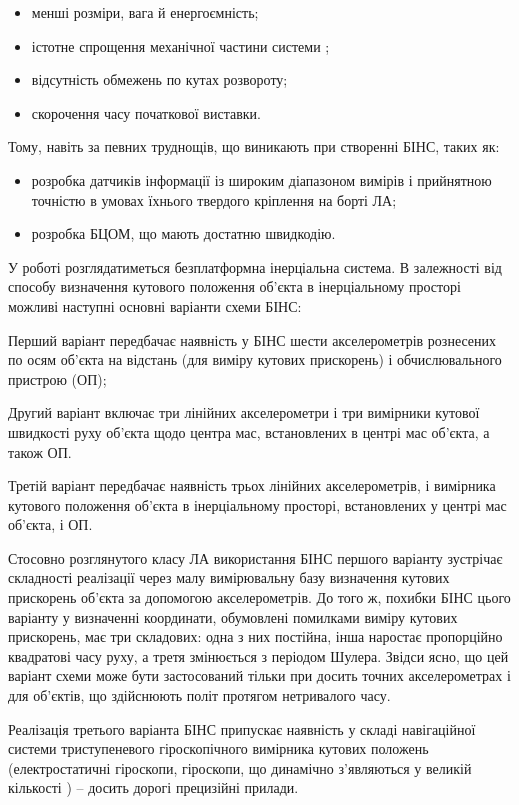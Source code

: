 \begin{itemize}
 \item менші розміри, вага й енергоємність;
 \item істотне спрощення механічної частини системи ; 
 \item відсутність обмежень по кутах розвороту;
 \item скорочення часу початкової виставки.
\end{itemize}

Тому, навіть за певних труднощів, що виникають при створенні БІНС, таких як:
\begin{itemize}
 \item розробка датчиків інформації із широким діапазоном вимірів і прийнятною точністю в умовах їхнього твердого кріплення на борті ЛА;
 \item розробка БЦОМ, що мають достатню швидкодію.
\end{itemize}

У роботі розглядатиметься безплатформна інерціальна система.
В залежності від способу визначення кутового положення об'єкта в інерціальному просторі 
можливі наступні основні варіанти схеми БІНС:

Перший варіант передбачає наявність у БІНС шести акселерометрів  рознесених по осям об'єкта на відстань 
(для виміру кутових прискорень) і обчислювального пристрою (ОП);

Другий варіант включає три лінійних акселерометри  і три вимірники кутової 
швидкості руху об'єкта щодо центра мас, встановлених в центрі мас об'єкта, а також ОП.

Третій варіант передбачає наявність трьох лінійних акселерометрів, і вимірника 
кутового положення об'єкта в інерціальному просторі, встановлених у центрі мас об'єкта, і ОП.

Стосовно розглянутого класу ЛА використання БІНС першого варіанту зустрічає складності 
реалізації через малу вимірювальну базу  визначення кутових прискорень об'єкта за 
допомогою акселерометрів. До того ж, похибки БІНС цього варіанту у визначенні координати, 
обумовлені помилками виміру кутових прискорень, має три складових: одна з них постійна, 
інша наростає пропорційно квадратові часу руху, а третя змінюється з періодом Шулера. 
Звідси ясно, що цей варіант схеми може бути застосований тільки при досить точних 
акселерометрах і для об'єктів, що здійснюють політ протягом нетривалого часу.
 
Реалізація третього варіанта БІНС припускає наявність у складі навігаційної 
системи триступеневого гіроскопічного вимірника кутових положень (електростатичні 
гіроскопи, гіроскопи, що динамічно з’являються у великій кількості ) -- 
досить дорогі  прецизійні прилади. 


